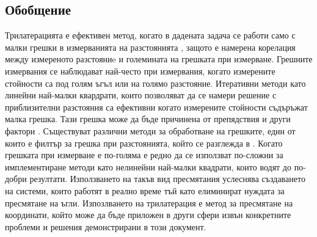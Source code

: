\subsection{Обобщение}

Трилатерацията е ефективен метод, когато в дадената задача се работи само с малки грешки в измерванията на разстоянията \cite{trilat}, защото е намерена корелация между измереното разстояниe и големината на грешката при измерване. Грешните измервания се наблюдават най-често при измервания, когато измерените стойности са под голям ъгъл или на голямо разстояние. Итеративни методи като линейни най-малки квардрати, които позволяват да се намери решение с приблизителни разстояния са ефективни когато измерените стойности съдъръжат малка грешка. Тази грешка може да бъде причинена от препядствия и други фактори \cite{yonei}. Съществуват различни методи за обработване на грешките, един от които е филтър за грешка при разстоянията, който се разглежда в \cite{yonei}. Когато грешката при измерване е по-голяма е редно да се използват по-сложни за имплементиране методи като нелинейни най-малки квадрати, които водят до по-добри резултати. Използването на такъв вид пресмятания услеснява създаването на системи, които работят в реално време тъй като елиминират нуждата за пресмятане на ъгли. Изпозлването на трилатерация е метод за пресмятане на координати, който може да бъде приложен в други сфери извън конкретните проблеми и решения демонстрирани в този документ. 